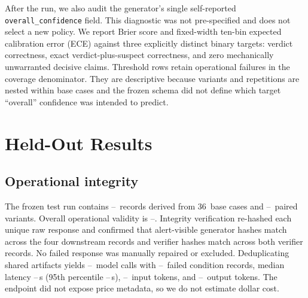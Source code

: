 \documentclass[letterpaper,twocolumn,10pt]{article}
\newcommand{\todoresult}{\textnormal{--}}
\newcommand{\TestRecords}{\todoresult}
\newcommand{\TestBaseCases}{36}
\newcommand{\TestVariants}{\todoresult}
\newcommand{\OperationalValidity}{\todoresult}
\providecommand{\OperationalFailures}{\todoresult}
\providecommand{\UniqueModelCalls}{\todoresult}
\providecommand{\MedianLatencySeconds}{\todoresult}
\providecommand{\NinetyFifthLatencySeconds}{\todoresult}
\providecommand{\InputTokens}{\todoresult}
\providecommand{\OutputTokens}{\todoresult}
\begin{document}
After the run, we also audit the generator's single self-reported
\texttt{overall\_confidence} field.  This diagnostic was not pre-specified and
does not select a new policy.  We report Brier score and fixed-width ten-bin
expected calibration error (ECE) against three explicitly distinct binary
targets: verdict correctness, exact verdict-plus-suspect correctness, and zero
mechanically unwarranted decisive claims.  Threshold rows retain operational
failures in the coverage denominator.  They are descriptive because variants
and repetitions are nested within base cases and the frozen schema did not
define which target ``overall'' confidence was intended to predict.

\section{Held-Out Results}
\label{sec:results}

\subsection{Operational integrity}

The frozen test run contains \TestRecords\ records derived from
\TestBaseCases\ base cases and \TestVariants\ paired variants.  Overall
operational validity is \OperationalValidity.  Integrity verification
re-hashed each unique raw response and confirmed that alert-visible generator
hashes match across the four downstream records and verifier hashes match
across both verifier records.  No failed response was manually repaired or
excluded.  Deduplicating shared artifacts yields \UniqueModelCalls\ model
calls with \OperationalFailures\ failed condition records, median latency
\MedianLatencySeconds\,s (95th percentile \NinetyFifthLatencySeconds\,s),
\InputTokens\ input tokens, and \OutputTokens\ output tokens.  The endpoint
did not expose price metadata, so we do not estimate dollar cost.
\end{document}
